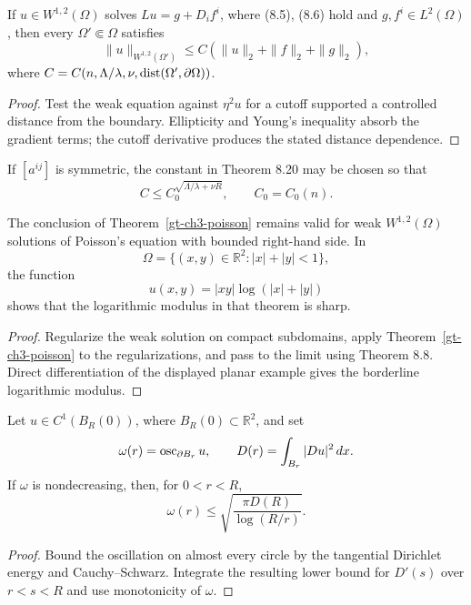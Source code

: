 \begin{proposition}
\label{gt-prop-8-interior-energy-estimate}
If $u\in W^{1,2}(\Omega)$ solves $Lu=g+D_if^i$, where (8.5), (8.6) hold and
$g,f^i\in L^2(\Omega)$, then every $\Omega'\Subset\Omega$ satisfies
\begin{equation}
\|u\|_{W^{1,2}(\Omega')}
\leq C(\|u\|_2+\|f\|_2+\|g\|_2),
\tag{8.101}
\end{equation}
where
$C=C(n,\Lambda/\lambda,\nu,\operatorname{dist}(\Omega',\partial\Omega))$.
\end{proposition}
\begin{proof}
\sketch Test the weak equation against $\eta^2u$ for a cutoff supported a
controlled distance from the boundary. Ellipticity and Young's inequality absorb
the gradient terms; the cutoff derivative produces the stated distance dependence.
\end{proof}

\begin{proposition}
\label{gt-prop-8-symmetric-harnack-constant}
If $[a^{ij}]$ is symmetric, the constant in Theorem 8.20 may be chosen so that
\[
C\leq C_0^{\sqrt{\Lambda/\lambda+\nu R}},
\qquad C_0=C_0(n).
\]
\end{proposition}

\begin{proposition}
\label{gt-prop-8-sobolev-poisson-sharpness}
The conclusion of Theorem~\ref{gt-ch3-poisson} remains valid for weak
$W^{1,2}(\Omega)$ solutions of Poisson's equation with bounded right-hand side.
In
\[
\Omega=\{(x,y)\in\mathbb R^2:|x|+|y|<1\},
\]
the function
\[
u(x,y)=|xy|\log(|x|+|y|)
\]
shows that the logarithmic modulus in that theorem is sharp.
\end{proposition}
\begin{proof}
\sketch Regularize the weak solution on compact subdomains, apply
Theorem~\ref{gt-ch3-poisson} to the regularizations, and pass to the limit using
Theorem 8.8. Direct differentiation of the displayed planar example gives the
borderline logarithmic modulus.
\end{proof}

\begin{lemma}
\label{gt-lem-8-planar-circle-oscillation}
Let $u\in C^1(B_R(0))$, where $B_R(0)\subset\mathbb R^2$, and set
\[
\omega(r)=\operatorname{osc}_{\partial B_r}u,
\qquad
D(r)=\int_{B_r}|Du|^2\,dx.
\]
If $\omega$ is nondecreasing, then, for $0<r<R$,
\[
\omega(r)\leq\sqrt{\frac{\pi D(R)}{\log(R/r)}}.
\]
\end{lemma}
\begin{proof}
\sketch Bound the oscillation on almost every circle by the tangential
Dirichlet energy and Cauchy--Schwarz. Integrate the resulting lower bound for
$D'(s)$ over $r<s<R$ and use monotonicity of $\omega$.
\end{proof}

